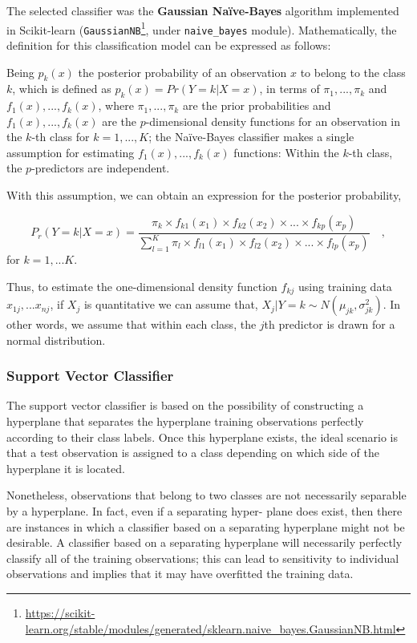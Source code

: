 \documentclass[a4paper, 12pt]{book}
\begin{document}
The selected classifier was the \textbf{Gaussian Naïve-Bayes} algorithm implemented in Scikit-learn (\texttt{GaussianNB}\footnote{\url{https://scikit-learn.org/stable/modules/generated/sklearn.naive_bayes.GaussianNB.html}}, under \texttt{naive\_bayes} module). Mathematically, the definition for this classification model can be expressed as follows:

Being $p_{k}(x)$ the posterior probability of an observation $x$ to belong to the class $k$, which is defined as $p_{k}(x)= Pr(Y = k|X = x)$, in terms of $\pi_{1},...,\pi_{k}$ and $f_{1}(x),...,f_{k}(x)$, where $\pi_{1},...,\pi_{k}$ are the prior probabilities and $f_{1}(x),...,f_{k}(x)$ are the $p$-dimensional density functions for an observation in the $k$-th class for $k=1,...,K$; the Naïve-Bayes classifier makes a single assumption for estimating $f_{1}(x),...,f_{k}(x)$ functions: Within the $k$-th class, the $p$-predictors are independent.

With this assumption, we can obtain an expression for the posterior probability,

\begin{center}
\begin{equation}
P_{r}(Y = k|X = x) = \frac{\pi_{k} \times f_{k1}(x_{1}) \times f_{k2}(x_{2}) \times ... \times f_{kp}(x_{p})}{\sum_{l=1}^{K} \pi_{l} \times f_{l1}(x_{1}) \times f_{l2}(x_{2}) \times ... \times f_{lp}(x_{p})} \quad,
\end{equation}
for $k = 1,...K$.
\end{center}

Thus, to estimate the one-dimensional density function $f_{kj}$ using training data $x_{1j},...x_{nj}$, if $X_{j}$ is quantitative we can assume that, $X_{j}|Y=k \sim N(\mu_{jk}, \sigma^2_{jk})$. In other words, we assume that within each class, the $j$th predictor is drawn for a normal distribution.

\subsubsection{Support Vector Classifier}
\label{sssec:linear-svms}

The support vector classifier is based on the possibility of constructing a
hyperplane that separates the hyperplane training observations perfectly
according to their class labels. Once this hyperplane exists, the ideal scenario
is that a test observation is assigned to a class depending on which side of
the hyperplane it is located.

Nonetheless, observations that belong to two classes are not
necessarily separable by a hyperplane. In fact, even if a separating hyper-
plane does exist, then there are instances in which a classifier based on
a separating hyperplane might not be desirable. A classifier based on a
separating hyperplane will necessarily perfectly classify all of the training
observations; this can lead to sensitivity to individual observations and implies
that it may have overfitted the training data.
\end{document}
